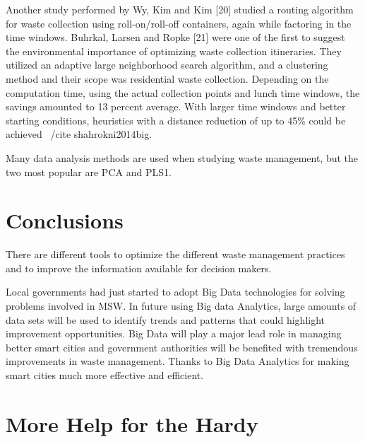 \documentclass[sigconf]{acmart}
\begin{document}
Another study performed by Wy, Kim and Kim [20] studied a routing algorithm for waste collection using roll-on/roll-off containers, again while factoring in the time windows. Buhrkal, Larsen and Ropke [21] were one of the ﬁrst to suggest the environmental importance of optimizing waste collection itineraries. They utilized an adaptive large neighborhood search algorithm, and a clustering method and their scope was residential waste collection. Depending on the computation time, using the actual collection points and lunch time windows, the savings amounted to 13 percent average. With larger time windows and better starting conditions, heuristics with a distance reduction of up to 45\% could be achieved ~/cite {shahrokni2014big}.






Many data analysis methods are used when studying waste management, but the two most popular are PCA and PLS1. 
~\cite{bohm2013}




\section{Conclusions}

There are different tools to optimize the different waste management practices  and to improve the information available for decision makers.

Local governments had just started to adopt Big Data technologies for solving problems involved in MSW. In future using Big data Analytics, large amounts of data sets will be used to identify trends and patterns that could highlight improvement opportunities. Big Data will play a major lead role in managing better smart cities and government authorities will be benefited with tremendous improvements in waste management. Thanks to Big Data Analytics for making smart cities much more effective and efficient.

\appendix



\section{More Help for the Hardy}
\appendix



\end{document}
